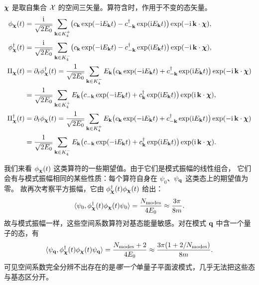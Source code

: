 \begin{keybox}
$\boldsymbol{\chi}$ 是取自集合 $\mathcal{X}$ 的空间三矢量。算符含时，作用于不变的态矢量。
\begin{align*}
\phi_{\boldsymbol{\chi}}(t)&=\frac{\mathrm{i}}{\sqrt{2E_{0}}}\sum_{\mathbf{k}\in K_{4}^{+}}
\bigl(c_{\mathbf{k}}\exp(-\mathrm{i} E_{\mathbf{k}}t)-c^{\dagger}_{-\mathbf{k}}\exp(\mathrm{i} E_{\mathbf{k}}t)\bigr)\exp(-\mathrm{i}\,\mathbf{k}\cdot\boldsymbol{\chi}),\\
\phi^{\dagger}_{\boldsymbol{\chi}}(t)&=\frac{\mathrm{i}}{\sqrt{2E_{0}}}\sum_{\mathbf{k}\in K_{4}^{-}}
\bigl(c_{\mathbf{k}}\exp(-\mathrm{i} E_{\mathbf{k}}t)-c^{\dagger}_{-\mathbf{k}}\exp(\mathrm{i} E_{\mathbf{k}}t)\bigr)\exp(-\mathrm{i}\,\mathbf{k}\cdot\boldsymbol{\chi}),\\
\Pi_{\boldsymbol{\chi}}(t)&=\partial_{t}\phi^{\dagger}_{\boldsymbol{\chi}}(t)
=\frac{1}{\sqrt{2E_{0}}}\sum_{\mathbf{k}\in K_{4}^{-}}E_{\mathbf{k}}
\bigl(c_{\mathbf{k}}\exp(-\mathrm{i} E_{\mathbf{k}}t)+c^{\dagger}_{-\mathbf{k}}\exp(\mathrm{i} E_{\mathbf{k}}t)\bigr)\exp(-\mathrm{i}\,\mathbf{k}\cdot\boldsymbol{\chi})\\
&=\frac{1}{\sqrt{2E_{0}}}\sum_{\mathbf{k}\in K_{4}^{+}}E_{\mathbf{k}}
\bigl(c_{-\mathbf{k}}\exp(-\mathrm{i} E_{\mathbf{k}}t)+c^{\dagger}_{\mathbf{k}}\exp(\mathrm{i} E_{\mathbf{k}}t)\bigr)\exp(\mathrm{i}\,\mathbf{k}\cdot\boldsymbol{\chi}),\\
\Pi^{\dagger}_{\boldsymbol{\chi}}(t)&=\partial_{t}\phi_{\boldsymbol{\chi}}(t)
=\frac{1}{\sqrt{2E_{0}}}\sum_{\mathbf{k}\in K_{4}^{+}}E_{\mathbf{k}}
\bigl(c_{\mathbf{k}}\exp(-\mathrm{i} E_{\mathbf{k}}t)+c^{\dagger}_{-\mathbf{k}}\exp(\mathrm{i} E_{\mathbf{k}}t)\bigr)\exp(-\mathrm{i}\,\mathbf{k}\cdot\boldsymbol{\chi})\\
&=\frac{1}{\sqrt{2E_{0}}}\sum_{\mathbf{k}\in K_{4}^{-}}E_{\mathbf{k}}
\bigl(c_{-\mathbf{k}}\exp(-\mathrm{i} E_{\mathbf{k}}t)+c^{\dagger}_{\mathbf{k}}\exp(\mathrm{i} E_{\mathbf{k}}t)\bigr)\exp(\mathrm{i}\,\mathbf{k}\cdot\boldsymbol{\chi}).
\end{align*}
\end{keybox}

我们来看 $\phi_{\boldsymbol{\chi}}(t)$ 这类算符的一些期望值。由于它们是模式振幅的线性组合，
它们会有与模式振幅相同的某些性质：每个算符自身在 $\psi_{0}$、$\psi_{\mathbf{q}}$ 这类态上的期望值为零。
故再次考察平方振幅，它由 $\phi^{\dagger}_{\boldsymbol{\chi}}(t)\phi_{\boldsymbol{\chi}}(t)$ 给出：
\begin{equation*}
\langle\psi_{0},\phi^{\dagger}_{\boldsymbol{\chi}}(t)\phi_{\boldsymbol{\chi}}(t)\psi_{0}\rangle
=\frac{N_{\text{modes}}}{4E_{0}}\approx\frac{3\pi}{8m} .
\end{equation*}
故与模式振幅一样，这些空间系数算符对基态能量敏感。对在模式 $\mathbf{q}$ 中含一个量子的态，有
\begin{equation*}
\langle\psi_{\mathbf{q}},\phi^{\dagger}_{\boldsymbol{\chi}}(t)\phi_{\boldsymbol{\chi}}(t)\psi_{\mathbf{q}}\rangle
=\frac{N_{\text{modes}}+2}{4E_{0}}\approx\frac{3\pi(1+2/N_{\text{modes}})}{8m}.
\end{equation*}
可见空间系数完全分辨不出存在的是\emph{哪一个}单量子平面波模式，几乎无法把这些态与基态区分开。

